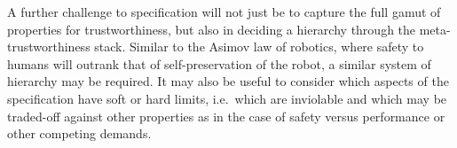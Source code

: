 \documentclass[sigconf,nonacm]{acmart}%
\begin{document}
	A further challenge to specification will not just be to capture the full gamut of properties for trustworthiness, but also in deciding a hierarchy through the meta-trustworthiness stack. 
	Similar to the Asimov law of robotics, where safety to humans will outrank that of self-preservation of the robot, a similar system of hierarchy may be required.
	It may also be useful to consider which aspects of the specification have soft or hard limits, i.e.\ which are inviolable and which may be traded-off against other properties as in the case of safety versus performance or other competing demands. 
	
\end{document}
